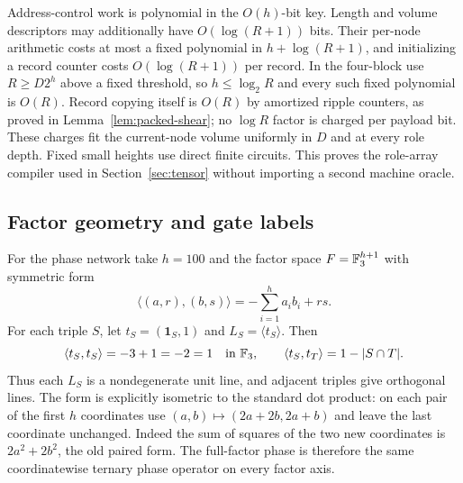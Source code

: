 Address-control work is polynomial in the $O(h)$-bit key. Length and volume descriptors may additionally have $O(\log(R+1))$ bits. Their per-node arithmetic costs at most a fixed polynomial in $h+\log(R+1)$, and initializing a record counter costs $O(\log(R+1))$ per record. In the four-block use $R\ge D2^h$ above a fixed threshold, so $h\le\log_2R$ and every such fixed polynomial is $O(R)$. Record copying itself is $O(R)$ by amortized ripple counters, as proved in Lemma~\ref{lem:packed-shear}; no $\log R$ factor is charged per payload bit. These charges fit the current-node volume uniformly in $D$ and at every role depth. Fixed small heights use direct finite circuits. This proves the role-array compiler used in Section~\ref{sec:tensor} without importing a second machine oracle.

\subsection{Factor geometry and gate labels}

For the phase network take $h=100$ and the factor space $F=\mathbb F_3^{h+1}$ with symmetric form
\[
 \langle(a,r),(b,s)\rangle=-\sum_{i=1}^h a_i b_i+rs.
\]
For each triple $S$, let $t_S=(\mathbf 1_S,1)$ and $L_S=\langle t_S\rangle$. Then
\[
 \langle t_S,t_S\rangle=-3+1=-2=1\quad\text{in }\mathbb F_3,
 \qquad \langle t_S,t_T\rangle=1-|S\cap T|.
\]
Thus each $L_S$ is a nondegenerate unit line, and adjacent triples give orthogonal lines. The form is explicitly isometric to the standard dot product: on each pair of the first $h$ coordinates use $(a,b)\mapsto(2a+2b,2a+b)$ and leave the last coordinate unchanged. Indeed the sum of squares of the two new coordinates is $2a^2+2b^2$, the old paired form. The full-factor phase is therefore the same coordinatewise ternary phase operator on every factor axis.

